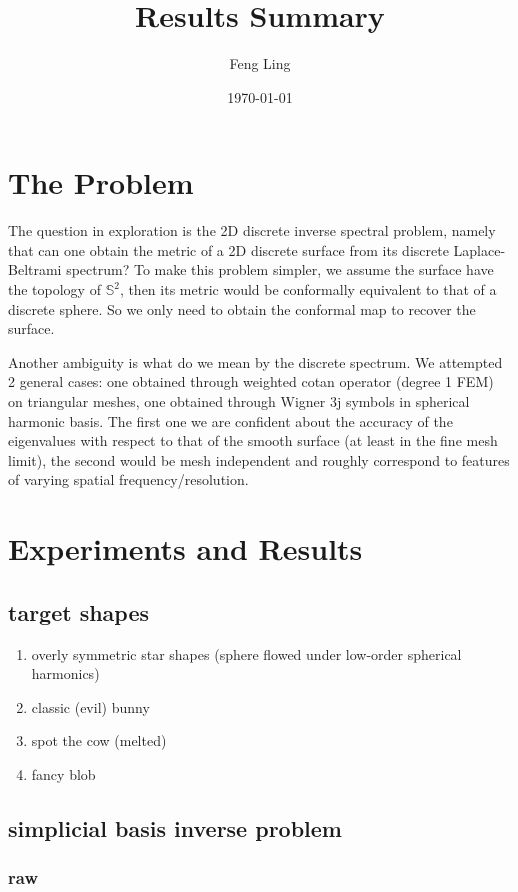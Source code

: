 \documentclass[11pt]{article}
\title{Results Summary}
\author{Feng Ling}
\date{\monthyear\today}
\theoremstyle{definition}
\begin{document}
\maketitle
\thispagestyle{empty}

\section{The Problem}
The question in exploration is the 2D discrete inverse spectral problem, namely that can one obtain the metric of a 2D discrete surface from its discrete Laplace-Beltrami spectrum? To make this problem simpler, we assume the surface have the topology of $\mathbb S^2$, then its metric would be conformally equivalent to that of a discrete sphere. So we only need to obtain the conformal map to recover the surface.

Another ambiguity is what do we mean by the discrete spectrum. We attempted 2 general cases: one obtained through weighted cotan operator (degree 1 FEM) on triangular meshes, one obtained through Wigner 3j symbols in spherical harmonic basis. The first one we are confident about the accuracy of the eigenvalues with respect to that of the smooth surface (at least in the fine mesh limit), the second would be mesh independent and roughly correspond to features of varying spatial frequency/resolution.

\section{Experiments and Results}
\subsection{target shapes}
\begin{enumerate}
	\item overly symmetric star shapes (sphere flowed under low-order spherical harmonics)
	
	\item classic (evil) bunny
	\item spot the cow (melted)
	\item fancy blob
\end{enumerate}
\subsection{simplicial basis inverse problem}
\subsubsection{raw}
\end{document}
